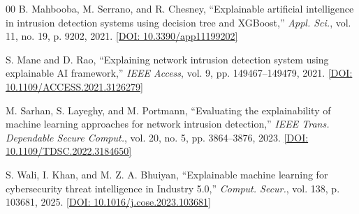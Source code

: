 \documentclass[conference]{IEEEtran}
\begin{document}
\begin{thebibliography}{00}
B. Mahbooba, M. Serrano, and R. Chesney, ``Explainable artificial intelligence in intrusion detection systems using decision tree and XGBoost,'' \textit{Appl. Sci.}, vol. 11, no. 19, p. 9202, 2021. \href{https://doi.org/10.3390/app11199202}{[DOI: 10.3390/app11199202]}

S. Mane and D. Rao, ``Explaining network intrusion detection system using explainable AI framework,'' \textit{IEEE Access}, vol. 9, pp. 149467--149479, 2021. \href{https://doi.org/10.1109/ACCESS.2021.3126279}{[DOI: 10.1109/ACCESS.2021.3126279]}

M. Sarhan, S. Layeghy, and M. Portmann, ``Evaluating the explainability of machine learning approaches for network intrusion detection,'' \textit{IEEE Trans. Dependable Secure Comput.}, vol. 20, no. 5, pp. 3864--3876, 2023. \href{https://doi.org/10.1109/TDSC.2022.3184650}{[DOI: 10.1109/TDSC.2022.3184650]}

S. Wali, I. Khan, and M. Z. A. Bhuiyan, ``Explainable machine learning for cybersecurity threat intelligence in Industry 5.0,'' \textit{Comput. Secur.}, vol. 138, p. 103681, 2025. \href{https://doi.org/10.1016/j.cose.2023.103681}{[DOI: 10.1016/j.cose.2023.103681]}

\end{thebibliography}
\end{document}
